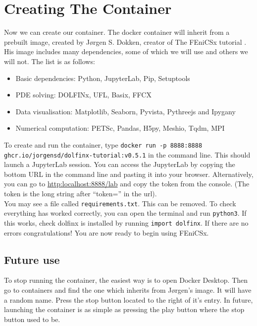 \documentclass[11pt]{article}
\def\code#1{\texttt{#1}}
\begin{document}
\section{Creating The Container}
Now we can create our container. The docker container will inherit from a prebuilt image, created by Jørgen S. Dokken, creator of The FEniCSx tutorial \cite{jsdokken}. His image includes many dependencies, some of which we will use and others we will not. The list is as follows:
\begin{itemize}
\item Basic dependencies: Python, JupyterLab, Pip, Setuptools 
\item PDE solving: DOLFINx, UFL, Basix, FFCX
\item Data visualisation: Matplotlib, Seaborn, Pyvista, Pythreejs and Ipygany
\item Numerical computation: PETSc, Pandas, H5py, Meshio, Tqdm, MPI
\end{itemize}
To create and run the container, type \code{docker run -p 8888:8888 \\ ghcr.io/jorgensd/dolfinx-tutorial:v0.5.1} in the command line. This should launch a JupyterLab session. You can access the JupyterLab by copying the bottom URL in the command line and pasting it into your browser. Alternatively, you can go to \url{http:localhost:8888/lab} and copy the token from the console. (The token is the long string after ``token='' in the url). \\ You may see a file called \code{requirements.txt}. This can be removed. To check everything has worked correctly, you can open the terminal and run \code{python3}. If this works, check dolfinx is installed by running \code{import dolfinx}. If there are no errors congratulations! You are now ready to begin using FEniCSx.

\subsection{Future use}
To stop running the container, the easiest way is to open Docker Desktop. Then go to containers and find the one which inherits from Jørgen's image. It will have a random name. Press the stop button located to the right of it's entry. In future, launching the container is as simple as pressing the play button where the stop button used to be.

\pagebreak
\end{document}
